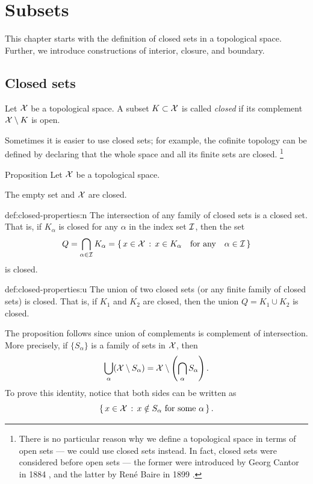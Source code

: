\chapter{Subsets}

This chapter starts with the definition of closed sets in a topological space.
Further, we introduce constructions of interior, closure, and boundary.

\section{Closed sets}\label{sec:closed-sets}

Let $\mathcal{X}$ be a topological space. 
A subset $K\subset \mathcal{X}$ is called \emph{closed} if its complement $\mathcal{X}\setminus K$ is open.

Sometimes it is easier to use closed sets; 
for example, the cofinite topology can be defined by declaring that the whole space and all its finite sets are closed.%
\footnote{There is no particular reason why we define a topological space in terms of open sets --- we could use closed sets instead.
In fact, closed sets were considered before open sets --- the former were introduced by Georg Cantor in 1884 \cite{cantor}, and the latter by René Baire in 1899 \cite{baire}.}

\begin{thm}{Proposition}\label{prop:closed-properties}
Let $\mathcal{X}$ be a topological space. 
\begin{subthm}{}
 The empty set and $\mathcal{X}$ are closed.
\end{subthm}

\begin{subthm}{def:closed-properties:n}
The intersection of any family of closed sets is a closed set.
That is, if $K_\alpha$ is closed for any $\alpha$ in the index set $\mathcal{I}$,
then the set
\[Q=\bigcap_{\alpha\in \mathcal{I}} K_\alpha
=
\left\{\,{x\in \mathcal{X}}\,:\,{x\in K_\alpha\quad\text{for any}\quad\alpha\in \mathcal{I}}\,\right\}\]
is closed.
\end{subthm}

\begin{subthm}{def:closed-properties:u}
The union of two closed sets (or any finite family of closed sets) is closed.
That is,  if $K_1$ and $K_2$ are closed, then the union $Q=K_1 \cup K_2$ is closed. 
\end{subthm}

\end{thm}

The proposition follows since union of complements is complement of intersection.
More precisely, if $\{S_\alpha\}$ is a family of sets in $\mathcal{X}$, then
\[\bigcup_\alpha (\mathcal{X}\setminus S_\alpha)=\mathcal{X}\setminus \left(\bigcap_\alpha S_\alpha\right).\]
To prove this identity, notice that both sides can be written as
\[\left\{\,{x\in \mathcal{X}}\,:\,{x\notin S_\alpha\ \text{for some}\  \alpha}\,\right\}.\]

